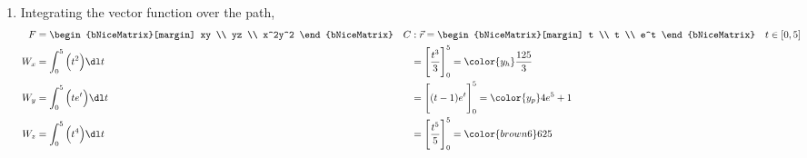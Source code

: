 \begin{enumerate}
    \item Integrating the vector function over the path,
          \begin{align}
              F   & = \begin{bNiceMatrix}[margin]
                          xy \\ yz \\ x^2y^2
                      \end{bNiceMatrix}               &
              C   & : \vec{r} = \begin{bNiceMatrix}[margin]
                                    t \\ t \\ e^t
                                \end{bNiceMatrix} \quad t \in [0, 5] \\
              W_x & = \int_{0}^{5} \Big( t^2 \Big) \dl t &
                  & = \Bigg[ \frac{t^3}{3} \Bigg]_0^{5}
              = \color{y_h} \frac{125}{3}                   \\
              W_y & = \int_{0}^{5} \Big( t e^t \Big) \dl t &
                  & = \Bigg[ (t - 1)e^t \Bigg]_0^{5}
              = \color{y_p} 4e^5 + 1                       \\
              W_z & = \int_{0}^{5} \Big( t^4 \Big) \dl t &
                  & = \Bigg[ \frac{t^5}{5} \Bigg]_0^{5}
              = \color{brown6} 625
          \end{align}
\end{enumerate}